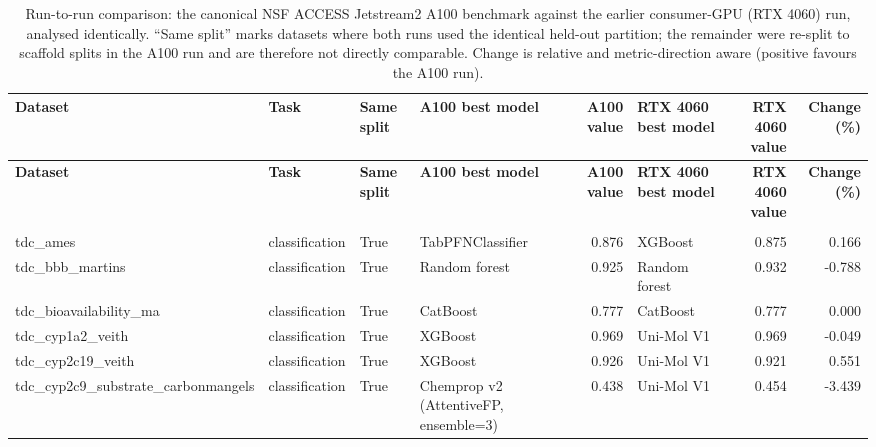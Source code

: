 \begin{landscape}
\begingroup\scriptsize
\begin{xltabular}{\linewidth}{@{}>{\raggedright\arraybackslash{}\hsize}X>{\raggedright\arraybackslash{}\hsize}X>{\raggedright\arraybackslash{}\hsize}X>{\raggedright\arraybackslash{}\hsize}Xr>{\raggedright\arraybackslash{}\hsize}Xrr@{}}
\caption{Run-to-run comparison: the canonical NSF ACCESS Jetstream2 A100 benchmark against the earlier consumer-GPU (RTX 4060) run, analysed identically. ``Same split'' marks datasets where both runs used the identical held-out partition; the remainder were re-split to scaffold splits in the A100 run and are therefore not directly comparable. Change is relative and metric-direction aware (positive favours the A100 run).}\label{tab:s5}\\
\toprule
\textbf{Dataset} & \textbf{Task} & \textbf{Same split} & \textbf{A100 best model} & \textbf{A100 value} & \textbf{RTX 4060 best model} & \textbf{RTX 4060 value} & \textbf{Change (\%)} \\
\midrule
\endfirsthead
\toprule
\textbf{Dataset} & \textbf{Task} & \textbf{Same split} & \textbf{A100 best model} & \textbf{A100 value} & \textbf{RTX 4060 best model} & \textbf{RTX 4060 value} & \textbf{Change (\%)} \\
\midrule
\endhead
\midrule
{}\\
\endfoot
\bottomrule
\endlastfoot
tdc\_\allowbreak{}ames & classification & True & TabPFNClassifier & 0.876 & XGBoost & 0.875 & 0.166 \\
tdc\_\allowbreak{}bbb\_\allowbreak{}martins & classification & True & Random forest & 0.925 & Random forest & 0.932 & -\allowbreak{}0.788 \\
tdc\_\allowbreak{}bioavailability\_\allowbreak{}ma & classification & True & Cat\allowbreak{}Boost & 0.777 & Cat\allowbreak{}Boost & 0.777 & 0.000 \\
tdc\_\allowbreak{}cyp1a2\_\allowbreak{}veith & classification & True & XGBoost & 0.969 & Uni-\allowbreak{}Mol V1 & 0.969 & -\allowbreak{}0.049 \\
tdc\_\allowbreak{}cyp2c19\_\allowbreak{}veith & classification & True & XGBoost & 0.926 & Uni-\allowbreak{}Mol V1 & 0.921 & 0.551 \\
tdc\_\allowbreak{}cyp2c9\_\allowbreak{}substrate\_\allowbreak{}carbonmangels & classification & True & Chemprop v2 (AttentiveFP, ensemble=3) & 0.438 & Uni-\allowbreak{}Mol V1 & 0.454 & -\allowbreak{}3.439 \\

\end{xltabular}
\end{landscape}
